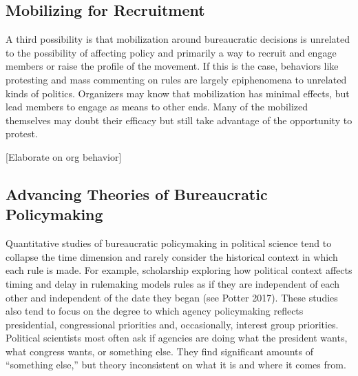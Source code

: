 





\subsection{Mobilizing for Recruitment}

A third possibility is that mobilization around bureaucratic decisions is unrelated to the possibility of affecting policy and primarily a way to recruit and engage members or raise the profile of the movement. If this is the case, behaviors like protesting and mass commenting on rules are largely epiphenomena to unrelated kinds of politics. Organizers may know that mobilization has minimal effects, but lead members to engage as means to other ends. Many of the mobilized themselves may doubt their efficacy but still take advantage of the opportunity to protest. 




[Elaborate on org behavior]

\subsection{Advancing Theories of Bureaucratic Policymaking}

Quantitative studies of bureaucratic policymaking in political science tend to collapse the time dimension and rarely consider the historical context in which each rule is made. For example, scholarship exploring how political context affects timing and delay in rulemaking models rules as if they are independent of each other and independent of the date they began (see Potter 2017). These studies also tend to focus on the degree to which agency policymaking reflects presidential, congressional priorities and, occasionally, interest group priorities. Political scientists most often ask if agencies are doing what the president wants, what congress wants, or something else. They find significant amounts of ``something else,'' but theory inconsistent on what it is and where it comes from. 


